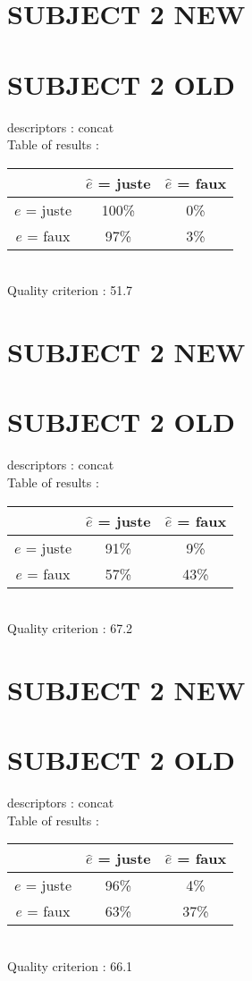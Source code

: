 \newpage
\section*{SUBJECT 2 NEW}
\newpage
\section*{SUBJECT 2 OLD}
descriptors : concat \\
Table of results : \\
\begin{tabular}{|c|c|c|}
\hline				& $\hat{e}$ = juste & $\hat{e}$ = faux \\
\hline  $e$ = juste	&    100\%			&      0\%		\\
\hline  $e$ = faux	&     97\%			&      3\%		\\
\hline
\end{tabular}\\
Quality criterion :   51.7 \\

\newpage
\section*{SUBJECT 2 NEW}
\newpage
\section*{SUBJECT 2 OLD}
descriptors : concat \\
Table of results : \\
\begin{tabular}{|c|c|c|}
\hline				& $\hat{e}$ = juste & $\hat{e}$ = faux \\
\hline  $e$ = juste	&     91\%			&      9\%		\\
\hline  $e$ = faux	&     57\%			&     43\%		\\
\hline
\end{tabular}\\
Quality criterion :   67.2 \\

\newpage
\section*{SUBJECT 2 NEW}
\newpage
\section*{SUBJECT 2 OLD}
descriptors : concat \\
Table of results : \\
\begin{tabular}{|c|c|c|}
\hline				& $\hat{e}$ = juste & $\hat{e}$ = faux \\
\hline  $e$ = juste	&     96\%			&      4\%		\\
\hline  $e$ = faux	&     63\%			&     37\%		\\
\hline
\end{tabular}\\
Quality criterion :   66.1 \\


